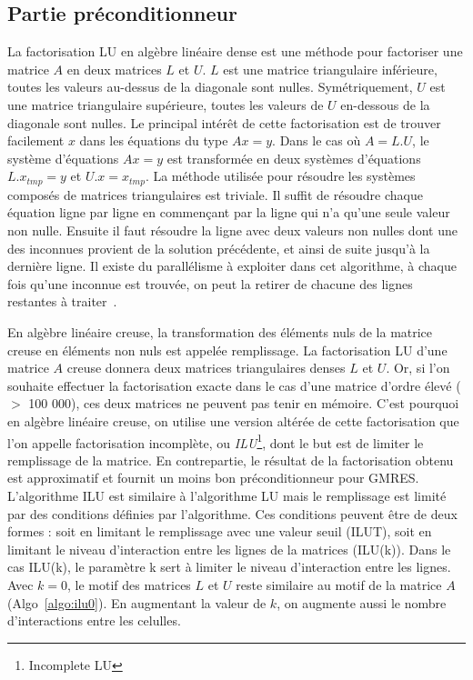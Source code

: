 \subsection{Partie préconditionneur}
La factorisation LU en algèbre linéaire dense est une méthode pour factoriser une matrice $A$ en deux matrices $L$ et $U$.
%
$L$ est une matrice triangulaire inférieure, toutes les valeurs au-dessus de la diagonale sont nulles.
%
Symétriquement, $U$ est une matrice triangulaire supérieure, toutes les valeurs de $U$ en-dessous de la diagonale sont nulles.
%
Le principal intérêt de cette factorisation est de trouver facilement $x$ dans les équations du type $Ax=y$.
%
Dans le cas où $A=L.U$, le système d'équations $Ax=y$ est transformée en deux systèmes d'équations $L.x_{tmp}=y$ et $U.x=x_{tmp}$.
%
La méthode utilisée pour résoudre les systèmes composés de matrices triangulaires est triviale.
%
Il suffit de résoudre chaque équation ligne par ligne en commençant par la ligne qui n'a qu'une seule valeur non nulle.
%
Ensuite il faut résoudre la ligne avec deux valeurs non nulles dont une des inconnues provient de la solution précédente, et ainsi de suite jusqu'à la dernière ligne.
%
Il existe du parallélisme à exploiter dans cet algorithme, à chaque fois qu'une inconnue est trouvée, on peut la retirer de chacune des lignes restantes à traiter~\cite{plasma_lu}.



En algèbre linéaire creuse, la transformation des éléments nuls de la matrice creuse en éléments non nuls est appelée remplissage.
%
La factorisation LU d'une matrice $A$ creuse donnera deux matrices triangulaires denses $L$ et $U$.
%
Or, si l'on souhaite effectuer la factorisation exacte dans le cas d'une matrice d'ordre élevé ($>$ 100 000), ces deux matrices ne peuvent pas tenir en mémoire.
%
C'est pourquoi en algèbre linéaire creuse, on utilise une version altérée de cette factorisation que l'on appelle factorisation incomplète, ou {\em ILU}\footnote{Incomplete LU}, dont le but est de limiter le remplissage de la matrice.
%
En contrepartie, le résultat de la factorisation obtenu est approximatif et fournit un moins bon préconditionneur pour GMRES.
%
L'algorithme ILU est similaire à l'algorithme LU mais le remplissage est limité par des conditions définies par l'algorithme.
%
Ces conditions peuvent être de deux formes : soit en limitant le remplissage avec une valeur seuil (ILUT\cite{saad1994ilut}), soit en limitant le niveau d'interaction entre les lignes de la matrices (ILU(k)).
%
Dans le cas ILU(k), le paramètre k sert à limiter le niveau d'interaction entre les lignes.
%
Avec $k=0$, le motif des matrices $L$ et $U$ reste similaire au motif de la matrice $A$ (Algo~\ref{algo:ilu0}).
%
En augmentant la valeur de $k$, on augmente aussi le nombre d'interactions entre les celulles.





